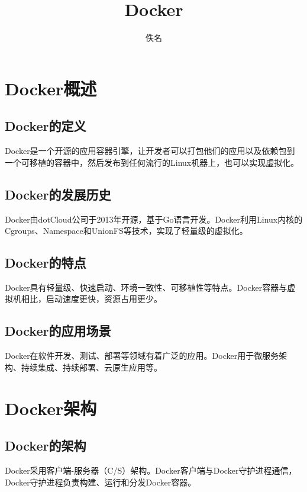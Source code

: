 \documentclass[12pt,UTF8]{ctexbook}
\title{\heiti\zihao{0} Docker}
\author{佚名}
\date{}
\begin{document}
\maketitle
\tableofcontents

\frontmatter

\mainmatter

\chapter{Docker概述}

\section{Docker的定义}

Docker是一个开源的应用容器引擎，让开发者可以打包他们的应用以及依赖包到一个可移植的容器中，然后发布到任何流行的Linux机器上，也可以实现虚拟化。

\section{Docker的发展历史}

Docker由dotCloud公司于2013年开源，基于Go语言开发。Docker利用Linux内核的Cgroups、Namespace和UnionFS等技术，实现了轻量级的虚拟化。

\section{Docker的特点}

Docker具有轻量级、快速启动、环境一致性、可移植性等特点。Docker容器与虚拟机相比，启动速度更快，资源占用更少。

\section{Docker的应用场景}

Docker在软件开发、测试、部署等领域有着广泛的应用。Docker用于微服务架构、持续集成、持续部署、云原生应用等。

\chapter{Docker架构}

\section{Docker的架构}

Docker采用客户端-服务器（C/S）架构。Docker客户端与Docker守护进程通信，Docker守护进程负责构建、运行和分发Docker容器。
\end{document}
